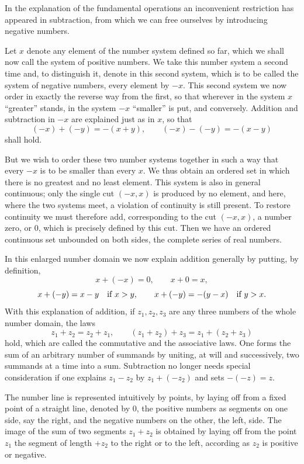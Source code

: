 \documentclass[11pt]{article}
\begin{document}
In the explanation of the fundamental operations an inconvenient restriction has appeared in subtraction, from which we can free ourselves by introducing negative numbers.

Let $x$ denote any element of the number system defined so far, which we shall now call the system of positive numbers. We take this number system a second time and, to distinguish it, denote in this second system, which is to be called the system of negative numbers, every element by $-x$. This second system we now order in exactly the reverse way from the first, so that wherever in the system $x$ ``greater'' stands, in the system $-x$ ``smaller'' is put, and conversely. Addition and subtraction in $-x$ are explained just as in $x$, so that
\[
 (-x)+(-y)=-(x+y),
 \qquad
 (-x)-(-y)=-(x-y)
\]
shall hold.

But we wish to order these two number systems together in such a way that every $-x$ is to be smaller than every $x$. We thus obtain an ordered set in which there is no greatest and no least element. This system is also in general continuous; only the single cut $(-x,x)$ is produced by no element, and here, where the two systems meet, a violation of continuity is still present. To restore continuity we must therefore add, corresponding to the cut $(-x,x)$, a number zero, or $0$, which is precisely defined by this cut. Then we have an ordered continuous set unbounded on both sides, the complete series of real numbers.

In this enlarged number domain we now explain addition generally by putting, by definition,
\[
 x+(-x)=0,
 \qquad x+0=x,
\]
\[
 x+(-y)=x-y\quad\hbox{if }x>y,
 \qquad
 x+(-y)=-(y-x)\quad\hbox{if }y>x.
\]
With this explanation of addition, if $z_1,z_2,z_3$ are any three numbers of the whole number domain, the laws
\[
 z_1+z_2=z_2+z_1,
 \qquad
 (z_1+z_2)+z_3=z_1+(z_2+z_3)
\]
hold, which are called the commutative and the associative laws. One forms the sum of an arbitrary number of summands by uniting, at will and successively, two summands at a time into a sum. Subtraction no longer needs special consideration if one explains $z_1-z_2$ by $z_1+(-z_2)$ and sets $-(-z)=z$.

The number line is represented intuitively by points, by laying off from a fixed point of a straight line, denoted by $0$, the positive numbers as segments on one side, say the right, and the negative numbers on the other, the left, side. The image of the sum of two segments $z_1+z_2$ is obtained by laying off from the point $z_1$ the segment of length $+z_2$ to the right or to the left, according as $z_2$ is positive or negative.
\end{document}
